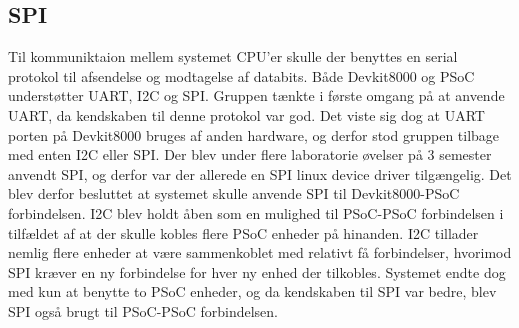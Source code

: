 \subsection{SPI}

Til kommuniktaion mellem systemet CPU'er skulle der benyttes en serial protokol til afsendelse og modtagelse af databits.
Både Devkit8000 og PSoC understøtter UART, I2C og SPI. Gruppen tænkte i første omgang på at anvende UART, da kendskaben til denne protokol var god.
Det viste sig dog at UART porten på Devkit8000 bruges af anden hardware, og derfor stod gruppen tilbage med enten I2C eller SPI. Der blev under flere 
laboratorie øvelser på 3 semester anvendt SPI, og derfor var der allerede en SPI linux device driver tilgængelig. Det blev derfor besluttet at systemet 
skulle anvende SPI til Devkit8000-PSoC forbindelsen. I2C blev holdt åben som en mulighed til PSoC-PSoC forbindelsen i tilfældet af at der skulle kobles 
flere PSoC enheder på hinanden. I2C tillader nemlig flere enheder at være sammenkoblet med relativt få forbindelser, hvorimod SPI kræver en ny forbindelse for 
hver ny enhed der tilkobles. Systemet endte dog med kun at benytte to PSoC enheder, og da kendskaben til SPI var bedre, blev SPI også brugt til PSoC-PSoC
forbindelsen.     